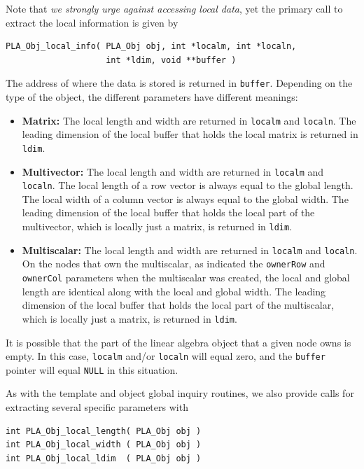 Note that {\em we strongly urge against accessing local data}, 
yet the primary call to extract the local information is given by
\begin{FlaSpec}
\begin{verbatim}
PLA_Obj_local_info( PLA_Obj obj, int *localm, int *localn,
                    int *ldim, void **buffer )
\end{verbatim}
\end{FlaSpec}
The address of where the data is stored is returned in {\tt buffer}.
Depending on the type of the object, the different parameters have different meanings:
\begin{itemize}
\item {\bf Matrix:}
The local length and width are returned in {\tt localm} and {\tt localn}.
The leading dimension of the local buffer that holds the local matrix is
returned in {\tt ldim}.
\item {\bf Multivector:}
The local length and width are returned in {\tt localm} and {\tt localn}.
The local length of a row vector is always equal to the global length.
The local width of a column vector is always equal to the global width.
The leading dimension of the local buffer that holds the local part of the 
multivector, which is locally just a matrix, is returned in {\tt ldim}.
\item {\bf Multiscalar:}
The local length and width are returned in {\tt localm} and {\tt localn}.
On the nodes that own the multiscalar, as indicated the {\tt ownerRow} and
{\tt ownerCol} parameters when the multiscalar was created, the local and
global length are identical along with the local and global width.
The leading dimension of the local buffer that holds the local part of the multiscalar,
which is locally just a matrix, is returned in {\tt ldim}.
\end{itemize}
It is possible that the part of the linear algebra object that a given node owns
is empty.  In this case, {\tt localm} and/or {\tt localn} will equal zero, and
the {\tt buffer} pointer will equal {\tt NULL} in this situation.

As with the template and object global inquiry routines, we also provide calls
for extracting several specific parameters with
\begin{FlaSpec}
\begin{verbatim}
int PLA_Obj_local_length( PLA_Obj obj )
int PLA_Obj_local_width ( PLA_Obj obj )
int PLA_Obj_local_ldim  ( PLA_Obj obj )
\end{verbatim}
\end{FlaSpec}


